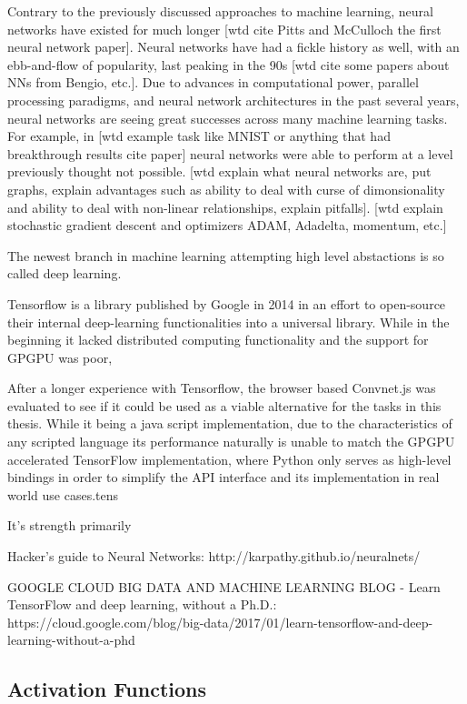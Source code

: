 Contrary to the previously discussed approaches to machine learning, neural networks have existed for much longer [wtd cite Pitts and McCulloch the first neural network paper].  Neural networks have had a fickle history as well, with an ebb-and-flow of popularity, last peaking in the 90s [wtd cite some papers about NNs from Bengio, etc.].  Due to advances in computational power, parallel processing paradigms, and neural network architectures in the past several years, neural networks are seeing great successes across many machine learning tasks.  For example, in [wtd example task like MNIST or anything that had breakthrough results cite paper] neural networks were able to perform at a level previously thought not possible.  [wtd explain what neural networks are, put graphs, explain advantages such as ability to deal with curse of dimonsionality and ability to deal with non-linear relationships, explain pitfalls]. [wtd explain stochastic gradient descent and optimizers ADAM, Adadelta, momentum, etc.]


The newest branch in machine learning attempting high level abstactions is so called deep learning. 

Tensorflow is a library published by Google in 2014 in an effort to open-source their internal deep-learning functionalities into a universal library. While in the beginning it lacked distributed computing functionality and the support for GPGPU was poor, 


After a longer experience with Tensorflow, the browser based Convnet.js was evaluated to see if it could be used as a viable alternative for the tasks in this thesis.
While it being a java script implementation, due to the characteristics of any scripted language its performance naturally is unable to match the GPGPU accelerated TensorFlow implementation, where Python only serves as high-level bindings in order to simplify the API interface and its implementation in real world use cases.tens

It's strength primarily 


Hacker's guide to Neural Networks: http://karpathy.github.io/neuralnets/

GOOGLE CLOUD BIG DATA AND MACHINE LEARNING BLOG - Learn TensorFlow and deep learning, without a Ph.D.: https://cloud.google.com/blog/big-data/2017/01/learn-tensorflow-and-deep-learning-without-a-phd


\subsection{Activation Functions}

